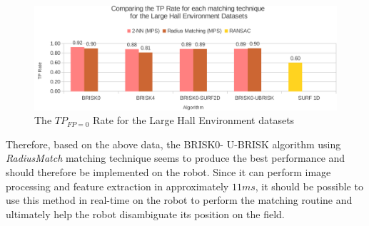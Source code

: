 \documentclass[11pt]{report}
\begin{document}
\begin{figure}
  \centering
    \includegraphics[width=1.0\textwidth]{../Drawings/Graphs/tp_rate_lh.pdf}
    \caption{The $TP_{FP=0}$ Rate for the Large Hall Environment datasets} 
    \label{fig:tp_rate_lh}
\end{figure}
%



Therefore, based on the above data, the BRISK0- U-BRISK algorithm using \textit{RadiusMatch} matching technique seems to produce the best performance and should therefore be implemented on the robot. Since it can perform image processing and feature extraction in approximately $11 ms$, it should be possible to use this method in real-time on the robot to perform the matching routine and ultimately help the robot disambiguate its position on the field.\\
\end{document}
